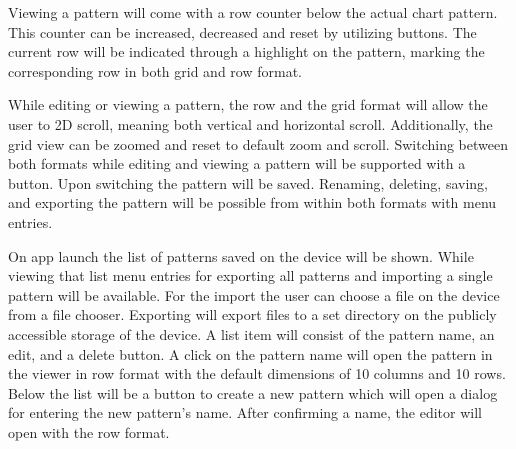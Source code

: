 Viewing a pattern will come with a row counter below the actual chart pattern. This counter can be increased, decreased and reset by utilizing buttons. The current row will be indicated through a highlight on the pattern, marking the corresponding row in both grid and row format.

While editing or viewing a pattern, the row and the grid format will allow the user to 2D scroll, meaning both vertical and horizontal scroll. Additionally, the grid view can be zoomed and reset to default zoom and scroll. Switching between both formats while editing and viewing a pattern will be supported with a button. Upon switching the pattern will be saved. Renaming, deleting, saving, and exporting the pattern will be possible from within both formats with menu entries.

On app launch the list of patterns saved on the device will be shown. While viewing that list menu entries for exporting all patterns and importing a single pattern will be available. For the import the user can choose a file on the device from a file chooser. Exporting will export files to a set directory on the publicly accessible storage of the device. A list item will consist of the pattern name, an edit, and a delete button. A click on the pattern name will open the pattern in the viewer in row format with the default dimensions of 10 columns and 10 rows. Below the list will be a button to create a new pattern which will open a dialog for entering the new pattern’s name. After confirming a name, the editor will open with the row format.


